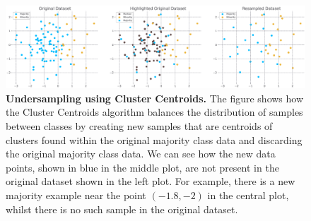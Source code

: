 \begin{figure}[t!]
    \centering
    \includegraphics[width=\linewidth]{figures/cluster_centroids.eps}
    \caption{
        \textbf{Undersampling using Cluster Centroids.} The figure shows how the Cluster Centroids
        algorithm balances the distribution of samples between classes by creating new samples that
        are centroids of clusters found within the original majority class data and discarding the
        original majority class data. We can see how the new data points, shown in blue in the
        middle plot, are not present in the original dataset shown in the left plot. For example,
        there is a new majority example near the point $(-1.8, -2)$ in the central plot, whilst
        there is no such sample in the original dataset.
    }
    \label{figure:cluster-centroids}
    \vspace*{5.2in}
\end{figure}
